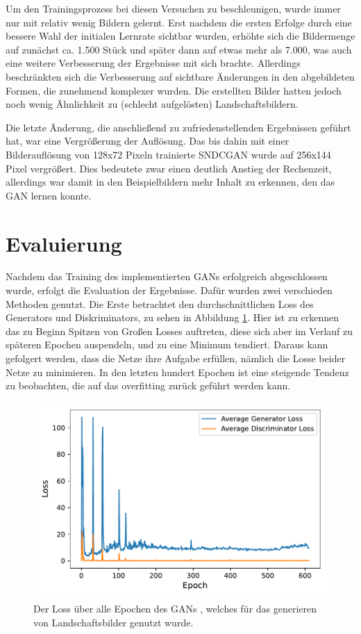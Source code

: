  Um den Trainingsprozess bei diesen Versuchen zu beschleunigen, wurde immer nur
 mit relativ wenig Bildern gelernt. Erst nachdem die ersten Erfolge durch eine
 bessere Wahl der initialen Lernrate sichtbar wurden, erhöhte sich die
 Bildermenge auf zunächst ca. 1.500 Stück und später dann auf etwas mehr als
 7.000, was auch eine weitere Verbesserung der Ergebnisse mit sich brachte.
 Allerdings beschränkten sich die Verbesserung auf sichtbare Änderungen in den
 abgebildeten Formen, die zunehmend komplexer wurden. Die erstellten Bilder
 hatten jedoch noch wenig Ähnlichkeit zu (schlecht aufgelösten)
 Landschaftsbildern.
 
 Die letzte Änderung, die anschließend zu zufriedenstellenden Ergebnissen
 geführt hat, war eine Vergrößerung der Auflösung. Das bis dahin mit einer
 Bilderauflösung von 128x72 Pixeln trainierte SNDCGAN wurde auf 256x144 Pixel
 vergrößert. Dies bedeutete zwar einen deutlich Anstieg der Rechenzeit,
 allerdings war damit in den Beispielbildern mehr Inhalt zu erkennen, den das
 GAN lernen konnte.
 
 \section{Evaluierung}\label{evalGen} Nachdem das Training des implementierten
  GANs erfolgreich abgeschlossen wurde, erfolgt die Evaluation der Ergebnisse.
  Dafür wurden zwei verschieden Methoden genutzt. Die Erste betrachtet den
  durchschnittlichen Loss des Generators und Diskriminators, zu sehen in
  Abbildung \ref{fig:plot_losses_gen}.  Hier ist zu erkennen das zu Beginn
  Spitzen von Großen Losses auftreten, diese sich aber im Verlauf zu späteren
  Epochen auspendeln, und zu eine Minimum tendiert. Daraus kann gefolgert
  werden, dass die Netze ihre Aufgabe erfüllen, nämlich die Losse beider Netze
  zu minimieren. In den letzten hundert Epochen ist eine steigende Tendenz zu
  beobachten, die auf das overfitting zurück geführt werden kann.
 
 
 
 
 \begin{figure}[t]
 	\centering
 	\includegraphics[width=0.7\linewidth]{images/plot_line_plot_losses_gen}
 	\caption[Losses des generirenden GANs]{Der Loss über alle Epochen des GANs , welches für das generieren von Landschaftsbilder genutzt wurde.}
 	\label{fig:plot_losses_gen}
 \end{figure}
 
